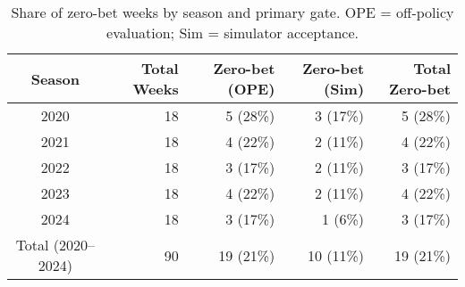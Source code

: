 \begin{table}[t]
  \centering
  \small
  \caption[Share of zero-bet weeks by season and primary gate]{Share of zero-bet weeks by season and primary gate. OPE = off-policy evaluation; Sim = simulator acceptance.}
  \label{tab:zero-weeks}
  \setlength{\tabcolsep}{4pt}\renewcommand{\arraystretch}{1.12}
  \begin{tabular}{@{} c r r r r @{} }
    \toprule
    \textbf{Season}  & \textbf{Total Weeks}  & \textbf{Zero-bet (OPE)}  & \textbf{Zero-bet (Sim)}  & \textbf{Total Zero-bet} \\
    \midrule
    2020 & 18 & 5 (28\%) & 3 (17\%) & 5 (28\%) \\
    2021 & 18 & 4 (22\%) & 2 (11\%) & 4 (22\%) \\
    2022 & 18 & 3 (17\%) & 2 (11\%) & 3 (17\%) \\
    2023 & 18 & 4 (22\%) & 2 (11\%) & 4 (22\%) \\
    2024 & 18 & 3 (17\%) & 1 (6\%) & 3 (17\%) \\
    \midrule
    Total (2020--2024) & 90 & 19 (21\%) & 10 (11\%) & 19 (21\%) \\
    \bottomrule
  \end{tabular}
\end{table}
